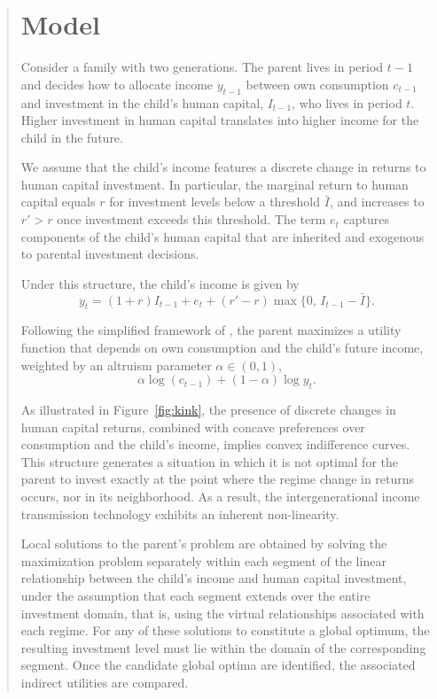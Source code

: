 \documentclass[12pt]{article}
\begin{document}
\begin{abstract}
\section{Model}

Consider a family with two generations. The parent lives in period $t-1$ and decides how to allocate income $y_{t-1}$ between own consumption $c_{t-1}$ and investment in the child’s human capital, $I_{t-1}$, who lives in period $t$. Higher investment in human capital translates into higher income for the child in the future.

We assume that the child’s income features a discrete change in returns to human capital investment. In particular, the marginal return to human capital equals $r$ for investment levels below a threshold $\bar I$, and increases to $r' > r$ once investment exceeds this threshold. The term $e_t$ captures components of the child’s human capital that are inherited and exogenous to parental investment decisions.

Under this structure, the child’s income is given by
\[
y_t = (1+r) I_{t-1} + e_t + (r' - r)\max\{0,\, I_{t-1} - \bar I\}.
\]

Following the simplified framework of \textcite{Solon_1999}, the parent maximizes a utility function that depends on own consumption and the child’s future income, weighted by an altruism parameter $\alpha \in (0,1)$,
\[
\alpha \log(c_{t-1}) + (1-\alpha)\log y_t.
\]

As illustrated in Figure~\ref{fig:kink}, the presence of discrete changes in human capital returns, combined with concave preferences over consumption and the child’s income, implies convex indifference curves. This structure generates a situation in which it is not optimal for the parent to invest exactly at the point where the regime change in returns occurs, nor in its neighborhood. As a result, the intergenerational income transmission technology exhibits an inherent non-linearity.

Local solutions to the parent’s problem are obtained by solving the maximization problem separately within each segment of the linear relationship between the child’s income and human capital investment, under the assumption that each segment extends over the entire investment domain, that is, using the virtual relationships associated with each regime. For any of these solutions to constitute a global optimum, the resulting investment level must lie within the domain of the corresponding segment. Once the candidate global optima are identified, the associated indirect utilities are compared.


\end{abstract}
\end{document}
